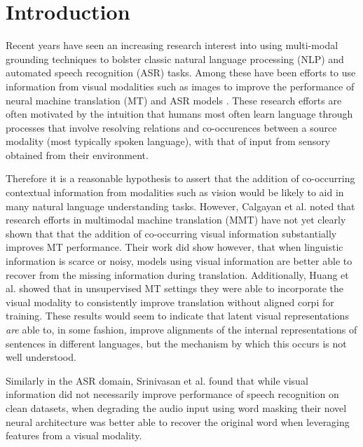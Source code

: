 \chapter{Introduction}
%

Recent years have seen an increasing research interest into using multi-modal grounding techniques to bolster classic natural language processing (NLP) and automated speech recognition (ASR) tasks.
Among these have been efforts to use information from visual modalities such as images to improve the performance of neural machine translation (MT) and ASR models \cite{ huang2020unsupervised, srinivasan2020fine, harwath2018interlingua,ohishi2020trilingual}.
These research efforts are often motivated by the intuition that humans most often learn language through processes that involve resolving relations and co-occurences between a source modality (most typically spoken language), with that of input from sensory obtained from their environment.

Therefore it is a reasonable hypothesis to assert that the addition of co-occurring contextual information from modalities such as vision would be likely to aid in many natural language understanding tasks. 
However, Calgayan et al. \cite{caglayan2019probing} noted that research efforts in multimodal machine translation (MMT) have not yet clearly shown that that the addition of co-occurring visual information substantially improves MT performance.
Their work did show however, that when linguistic information is scarce or noisy, models using visual information are better able to recover from the missing information during translation.
Additionally, Huang et al. \cite{huang2020unsupervised} showed that in unsupervised MT settings they were able to incorporate the visual modality to consistently improve translation without aligned corpi for training.
These results would seem to indicate that latent visual representations \textit{are} able to, in some fashion, improve alignments of the internal representations of sentences in different languages, but the mechanism by which this occurs is not well understood.

Similarly in the ASR domain, Srinivasan et al. \cite{srinivasan2020fine} found that while visual information did not necessarily improve performance of speech recognition on clean datasets, when degrading the audio input using word masking their novel neural architecture was better able to  recover the original word when leveraging features from a visual modality.

